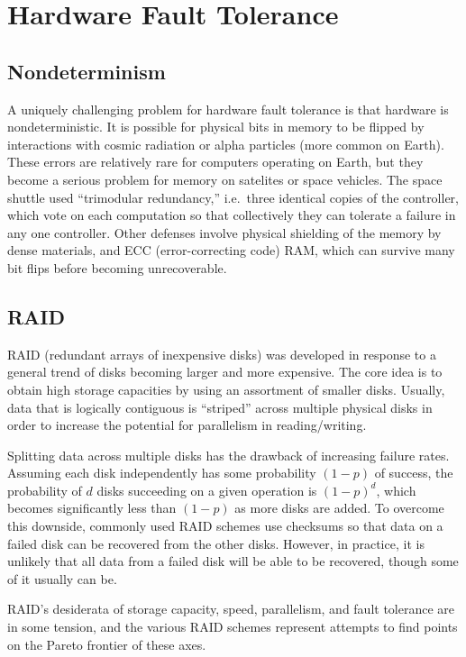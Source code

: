 \documentclass[twoside]{article}
\begin{document}
\section{Hardware Fault Tolerance}
\subsection{Nondeterminism}
A uniquely challenging problem for hardware fault tolerance is that hardware is nondeterministic.
It is possible for physical bits in memory to be flipped by interactions with cosmic radiation or alpha particles (more common on Earth).
These errors are relatively rare for computers operating on Earth, but they become a serious problem for memory on satelites or space vehicles.
The space shuttle used ``trimodular redundancy,'' i.e.\ three identical copies of the controller, which vote on each computation so that collectively they can tolerate a failure in any one controller.
Other defenses involve physical shielding of the memory by dense materials, and ECC (error-correcting code) RAM, which can survive many bit flips before becoming unrecoverable.

\subsection{RAID}
RAID (redundant arrays of inexpensive disks) was developed in response to a general trend of disks becoming larger and more expensive.
The core idea is to obtain high storage capacities by using an assortment of smaller disks.
Usually, data that is logically contiguous is ``striped'' across multiple physical disks in order to increase the potential for parallelism in reading/writing.

Splitting data across multiple disks has the drawback of increasing failure rates.
Assuming each disk independently has some probability $(1-p)$ of success, the probability of $d$ disks succeeding on a given operation is $(1-p)^d$, which becomes significantly less than $(1-p)$ as more disks are added.
To overcome this downside, commonly used RAID schemes use checksums so that data on a failed disk can be recovered from the other disks.
However, in practice, it is unlikely that all data from a failed disk will be able to be recovered, though some of it usually can be.

RAID's desiderata of storage capacity, speed, parallelism, and fault tolerance are in some tension, and the various RAID schemes represent attempts to find points on the Pareto frontier of these axes.
\end{document}
